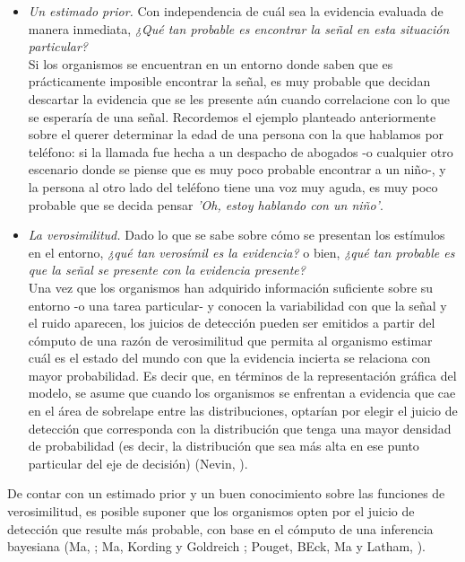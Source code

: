 \begin{itemize}
\item \textsl{Un estimado prior.} Con independencia de cuál sea la evidencia evaluada de manera inmediata, \textit{¿Qué tan probable es encontrar la señal en esta situación particular?}\\

Si los organismos se encuentran en un entorno donde saben que es prácticamente imposible encontrar la señal, es muy probable que decidan descartar la evidencia que se les presente aún cuando correlacione con lo que se esperaría de una señal. Recordemos el ejemplo planteado anteriormente sobre el querer determinar la edad de una persona con la que hablamos por teléfono: si la llamada fue hecha a un despacho de abogados -o cualquier otro escenario donde se piense que es muy poco probable encontrar a un niño-, y la persona al otro lado del teléfono tiene una voz muy aguda, es muy poco probable que se decida pensar \textit{'Oh, estoy hablando con un niño'}.\\

\item \textsl{La verosimilitud.} Dado lo que se sabe sobre cómo se presentan los estímulos en el entorno, \textit{¿qué tan verosímil es la evidencia?} o bien, \textit{¿qué tan probable es que la señal se presente con la evidencia presente?}\\

Una vez que los organismos han adquirido información suficiente sobre su entorno -o una tarea particular- y conocen la variabilidad con que la señal y el ruido aparecen, los juicios de detección pueden ser emitidos a partir del cómputo de una razón de verosimilitud que permita al organismo estimar cuál es el estado del mundo con que la evidencia incierta se relaciona con mayor probabilidad. Es decir que, en términos de la representación gráfica del modelo, se asume que cuando los organismos se enfrentan a evidencia que cae en el área de sobrelape entre las distribuciones, optarían por elegir el juicio de detección que corresponda con la distribución que tenga una mayor densidad de probabilidad (es decir, la distribución que sea más alta en ese punto particular del eje de decisión) (Nevin, \citeyear{Nevin1969}).\\
\end{itemize}

De contar con un estimado prior y un buen conocimiento sobre las funciones de verosimilitud, es posible suponer que los organismos opten por el juicio de detección que resulte más probable, con base en el cómputo de una inferencia bayesiana (Ma, \citeyear{WeijiMa}; Ma, Kording y Goldreich \citeyear{WeijiMa2012}; Pouget, BEck, Ma y Latham, \citeyear{Pouget2013}).\\

